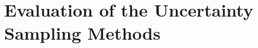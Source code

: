 \section{Evaluation of the Uncertainty Sampling Methods}
\label{ch:evaluation:sec:evaluation_methods}
















